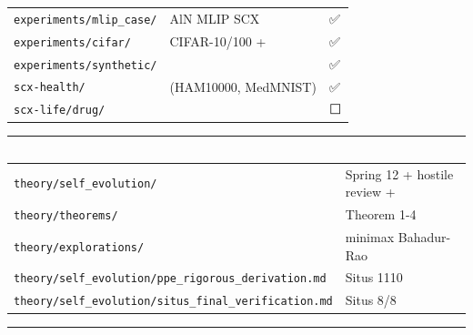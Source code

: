 \documentclass[
  12pt,
]{article}
\begin{document}
\begin{longtable}[]{@{}lll@{}}
\toprule\noalign{}
 &  &  \\
\midrule\noalign{}
\endhead
\bottomrule\noalign{}
\endlastfoot
\texttt{experiments/mlip\_case/} & AlN MLIP SCX  & ✅  \\
\texttt{experiments/cifar/} & CIFAR-10/100  +  & ✅
 \\
\texttt{experiments/synthetic/} &  & ✅ \\
\texttt{scx-health/} &  (HAM10000, MedMNIST) & ✅ \\
\texttt{scx-life/drug/} &  & ⬜  \\
\end{longtable}

\begin{center}\rule{0.5\linewidth}{0.5pt}\end{center}

\subsection{}\label{ux8bc1ux660eux4e0eux63a8ux5bfc}

\begin{longtable}[]{@{}
  >{\raggedright\arraybackslash}p{}
  >{\raggedright\arraybackslash}p{}@{}}
\toprule\noalign{}
\begin{minipage}[b]{\linewidth}\raggedright

\end{minipage} & \begin{minipage}[b]{\linewidth}\raggedright

\end{minipage} \\
\midrule\noalign{}
\endhead
\bottomrule\noalign{}
\endlastfoot
\texttt{theory/self\_evolution/} & Spring 12  + hostile review
+  \\
\texttt{theory/theorems/} & Theorem 1-4  \\
\texttt{theory/explorations/} & minimax Bahadur-Rao
 \\
\texttt{theory/self\_evolution/ppe\_rigorous\_derivation.md} & Situs
1110  \\
\texttt{theory/self\_evolution/situs\_final\_verification.md} & Situs
8/8  \\
\end{longtable}

\begin{center}\rule{0.5\linewidth}{0.5pt}\end{center}
\end{document}
